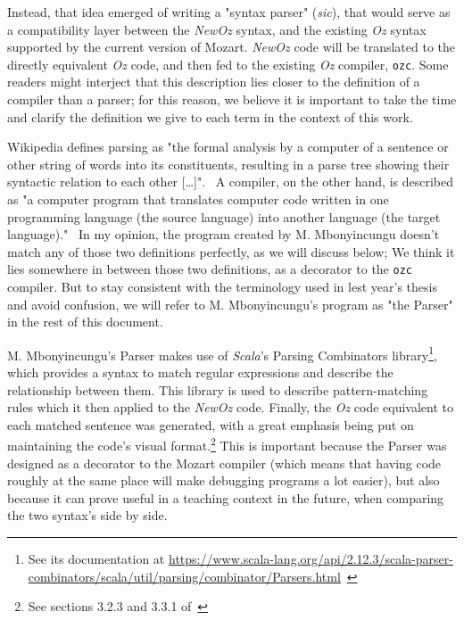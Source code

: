 Instead, that idea emerged of writing a "syntax parser" (\textit{sic}), that would serve as a compatibility layer between the \textit{NewOz} syntax, and the existing \textit{Oz} syntax supported by the current version of Mozart.
\textit{NewOz} code will be translated to the directly equivalent \textit{Oz} code, and then fed to the existing \textit{Oz} compiler, \texttt{ozc}.
Some readers might interject that this description lies closer to the definition of a compiler than a parser;
for this reason, we believe it is important to take the time and clarify the definition we give to each term in the context of this work.\newline

Wikipedia defines parsing as "the formal analysis by a computer of a sentence or other string of words into its constituents, resulting in a parse tree showing their syntactic relation to each other [\ldots]".~\cite{wikiParser}
A compiler, on the other hand, is described as "a computer program that translates computer code written in one programming language (the source language) into another language (the target language)."~\cite{wikiCompiler}
In my opinion, the program created by M. Mbonyincungu doesn't match any of those two definitions perfectly, as we will discuss below;
We think it lies somewhere in between those two definitions, as a decorator to the \texttt{ozc} compiler.
But to stay consistent with the terminology used in lest year's thesis and avoid confusion, we will refer to M. Mbonyincungu's program as "the Parser" in the rest of this document.\newline

M. Mbonyincungu's Parser makes use of \textit{Scala}'s Parsing Combinators library\footnote{See its documentation at \url{https://www.scala-lang.org/api/2.12.3/scala-parser-combinators/scala/util/parsing/combinator/Parsers.html}~\cite{ScalaParsers}}, which provides a syntax to match regular expressions and describe the relationship between them.
This library is used to describe pattern-matching rules which it then applied to the \textit{NewOz} code.
Finally, the \textit{Oz} code equivalent to each matched sentence was generated, with a great emphasis being put on maintaining the code's visual format.\footnote{See sections 3.2.3 and 3.3.1 of~\cite{jpthesis}}
This is important because the Parser was designed as a decorator to the Mozart compiler (which means that having code roughly at the same place will make debugging programs a lot easier), but also because it can prove useful in a teaching context in the future, when comparing the two syntax's side by side.\newline

